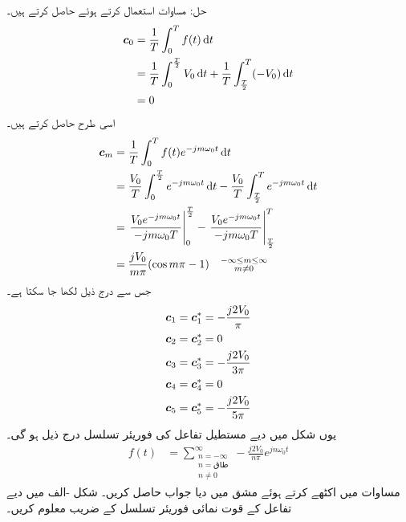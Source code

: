 حل: مساوات  استعمال کرتے ہوئے   حاصل کرتے ہیں۔
\begin{align*}
\kx{c}_0&=\frac{1}{T}\int_0^{T} f(t) \dif t\\
&=\frac{1}{T}\int_0^{\frac{T}{2}} V_0 \dif t+\frac{1}{T}\int_{\frac{T}{2}}^{T}(-V_0)\dif t\\
&=0
\end{align*}
اسی طرح  حاصل کرتے ہیں۔
\begin{align*}
\kx{c}_m&=\frac{1}{T} \int_0^{T} f(t) e^{-jm\omega_0 t} \dif t\\
&=\frac{V_0}{T}\int_0^{\frac{T}{2}} e^{-jm\omega_0 t} \dif t-\frac{V_0}{T}\int_{\frac{T}{2}}^T e^{-jm\omega_0 t} \dif t\\
&=\left. \frac{V_0 e^{-jm\omega_0 t}}{-jm\omega_0 T}\right|_{0}^{\frac{T}{2}}-\left. \frac{V_0 e^{-jm\omega_0 t}}{-jm\omega_0 T}\right|_{\frac{T}{2}}^{T}\\
&=\frac{jV_0}{m\pi}(\cos m\pi -1)\quad \substack{-\infty \le m \le \infty\\ m \ne 0}
\end{align*}
جس سے درج ذیل لکھا جا سکتا ہے۔
\begin{align*}
{\ensuremath{{\boldsymbol{c}}}}_1&={{\boldsymbol{c}}}^*_1=-\frac{j2V_0}{\pi}\\
{{\boldsymbol{c}}}_2&={{\boldsymbol{c}}}^*_2=0\\
{{\boldsymbol{c}}}_3&={{\boldsymbol{c}}}^*_3=-\frac{j2V_0}{3\pi}\\
{{\boldsymbol{c}}}_4&={{\boldsymbol{c}}}^*_4=0\\
{{\boldsymbol{c}}}_5&={{\boldsymbol{c}}}^*_5=-\frac{j2V_0}{5\pi}
\end{align*}
یوں شکل میں دیے مستطیل تفاعل کی فوریئر تسلسل درج ذیل ہو گی۔
\begin{align} \label{مساوات_فوریئر_مستطیل_دوسرا_جواب}
f(t)&=\sum_{\substack{n=-\infty \\ n=\text{طاق}\\ n \ne 0} }^{\infty} -\frac{j2V_0}{n\pi}e^{jn\omega_0 t}
\end{align}
مساوات  میں  اکٹھے کرتے ہوئے مشق  میں دیا جواب حاصل کریں۔
شکل -الف میں دیے تفاعل کے قوت نمائی فوریئر تسلسل کے  ضریب  معلوم کریں۔
